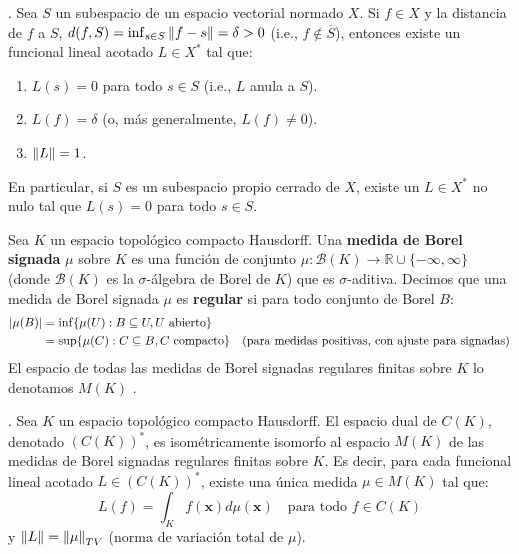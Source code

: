 \begin{theorem}
\label{thm:hahn_banach}
\citep[Thm. 4.3-2]{Kreyszig1989}. Sea $S$ un subespacio de un espacio vectorial normado $X$. Si $f \in X$ y la distancia de $f$ a $S$, $d(f,S) = \inf_{s \in S} \left\lVert f-s\right\rVert = \delta > 0$ (i.e., $f \notin \overline{S}$), entonces existe un funcional lineal acotado $L \in X^*$ tal que:
\begin{enumerate}
    \item $L(s) = 0$ para todo $s \in S$ (i.e., $L$ anula a $S$).
    \item $L(f) = \delta$ (o, más generalmente, $L(f) \neq 0$).
    \item $\left\lVert L\right\rVert = 1$.
\end{enumerate}
En particular, si $S$ es un subespacio propio cerrado de $X$, existe un $L \in X^*$ no nulo tal que $L(s)=0$ para todo $s \in S$.
\end{theorem}

\begin{definition}
Sea $K$ un espacio topológico compacto Hausdorff. Una \textbf{medida de Borel signada} $\mu$ sobre $K$ es una función de conjunto $\mu: \mathcal{B}(K) \to \mathbb{R} \cup \{-\infty, \infty\}$ (donde $\mathcal{B}(K)$ es la $\sigma$-álgebra de Borel de $K$) que es $\sigma$-aditiva.
Decimos que una medida de Borel signada $\mu$ es \textbf{regular} si para todo conjunto de Borel $B$:
\begin{align*}
    \left\lvert\mu(B)\right\rvert &= \inf \{ \mu(U) : B \subseteq U, U \text{ abierto} \} \\
    &= \sup \{ \mu(C) : C \subseteq B, C \text{ compacto} \} \quad (\text{para medidas positivas, con ajuste para signadas})
\end{align*}
El espacio de todas las medidas de Borel signadas regulares finitas sobre $K$ lo denotamos $M(K)$ \citep[Definición 6.2, 6.4]{Rudin1987}.
\end{definition}

\begin{theorem}
\label{thm:riesz_markov}
\citep[Thm. 6.19]{Rudin1987}. Sea $K$ un espacio topológico compacto Hausdorff. El espacio dual de $C(K)$, denotado $(C(K))^*$, es isométricamente isomorfo al espacio $M(K)$ de las medidas de Borel signadas regulares finitas sobre $K$. Es decir, para cada funcional lineal acotado $L \in (C(K))^*$, existe una única medida $\mu \in M(K)$ tal que:
\[ L(f) = \int_K f(\mathbf{x}) d\mu(\mathbf{x}) \quad \text{para todo } f \in C(K) \]
y $\left\lVert L\right\rVert = \left\lVert\mu\right\rVert_{TV}$ (norma de variación total de $\mu$).
\end{theorem}

